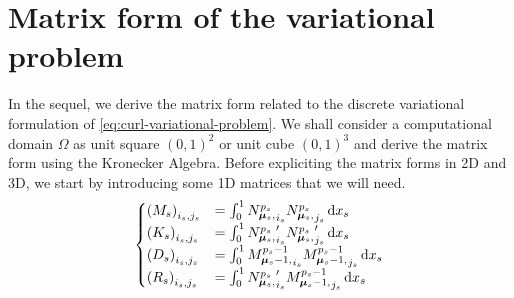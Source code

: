 \section{Matrix form of the variational problem}
In the sequel, we derive the matrix form related to the discrete variational formulation of \eqref{eq:curl-variational-problem}. 
We shall consider a computational domain $\Omega$ as unit square $(0,1)^2$ or unit cube $(0,1)^3$ and derive the matrix form using the Kronecker Algebra. 
Before expliciting the matrix forms in 2D and 3D, we start by introducing some 1D matrices that we will need.
\begin{align}
  \begin{cases}
    \left( M_{s} \right)_{i_s, j_s} &= \int_{0}^1 {N_{\boldsymbol{\mu}_s,}^{p_s}}_{i_s} {N_{\boldsymbol{\mu}_s,}^{p_s}}_{j_s} \,{\rm d} x_s
    \\
    \left( K_{s} \right)_{i_s, j_s} &= \int_{0}^1 {N_{\boldsymbol{\mu}_s,}^{p_s}}_{i_s}^\prime {N_{\boldsymbol{\mu}_s,}^{p_s}}_{j_s}^\prime \,{\rm d} x_s
    \\
    \left( D_{s} \right)_{i_s, j_s} &= \int_{0}^1 {M_{\boldsymbol{\mu}_s-1,}^{p_s-1}}_{i_s} {M_{\boldsymbol{\mu}_s-1,}^{p_s-1}}_{j_s} \,{\rm d} x_s
    \\
    \left( R_{s} \right)_{i_s, j_s} &= \int_{0}^1 {N_{\boldsymbol{\mu}_s,}^{p_s}}_{i_s}^\prime {M_{\boldsymbol{\mu}_s-1,}^{p_s-1}}_{j_s} \,{\rm d} x_s
  \end{cases}
\end{align}


